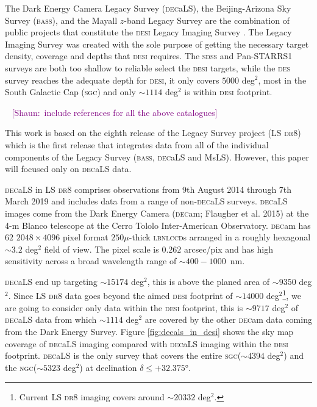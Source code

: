 \documentclass[fleqn,usenatbib]{mnras}
\newcommand{\shaun}[1]{~\newline\noindent \textcolor{Purple}{{ [Shaun:~{#1}]\\}}}
\newcommand{\BASS}{\textsc{bass}\xspace}
\newcommand{\CCDs}{\textsc{ccd}s\xspace}
\newcommand{\DECam}{\textsc{dec}am\xspace}
\newcommand{\DECaLS}{\textsc{dec}a\textsc{LS}\xspace}
\newcommand{\DESI}{\textsc{desi}\xspace}
\newcommand{\DES}{\textsc{des}\xspace}
\newcommand{\DReight}{\textsc{dr8}\xspace}
\newcommand{\LBNL}{\textsc{lbnl}\xspace}
\newcommand{\MzLS}{\textsc{M}s\textsc{LS}\xspace}
\newcommand{\NGC}{\textsc{ngc}\xspace}
\newcommand{\SDSS}{\textsc{sdss}\xspace}
\newcommand{\SGC}{\textsc{sgc}\xspace}
\newcommand{\PS}{\textsc{ps}1\xspace}
\begin{document}
The Dark Energy Camera Legacy Survey (\DECaLS), the Beijing-Arizona Sky Survey (\BASS), and the Mayall $z$-band Legacy Survey are the combination of public projects that constitute the \DESI Legacy Imaging Survey  \citep[hereafter the Legacy Survey][]{2019AJ....157..168D}. The Legacy Imaging Survey was created with the sole purpose of getting the necessary target density, coverage and depths that \DESI requires. The \SDSS \citep{Wang:2013noa} and Pan-STARRS1 \citep[\PS][]{2016arXiv161205560C} surveys are both too shallow to reliable select the \DESI targets, while the \DES survey\citep{Abbott:2005bi} reaches the adequate depth for \DESI, it only covers $5000$ deg$^2$, most in the South Galactic Cap (\SGC) and only $\sim 1114$ deg$^2$ is within \DESI footprint.

\shaun{include references for all the above catalogues} 

This work is based on the eighth release of the Legacy Survey project (LS \DReight) which is the first release that integrates data from all of the individual components of the Legacy Survey (\BASS, \DECaLS and \MzLS). However, this paper will focused only on \DECaLS data.

\DECaLS in LS \DReight comprises observations from 9th August 2014 through 7th March 2019 and includes data from a range of non-\DECaLS surveys. \DECaLS images come from the Dark Energy Camera (\DECam; Flaugher et al. 2015) at the 4-m Blanco telescope at the Cerro Tololo Inter-American Observatory. \DECam has $62$ $2048\times 4096$ pixel format $250 \mu$-thick \LBNL \CCDs arranged in a roughly hexagonal $\sim 3.2$ deg$^2$ field of view. The pixel scale is $0.262$ arcsec/pix and has high sensitivity across a broad wavelength range of $\sim 400-1000$~nm. 

\DECaLS end up targeting $\sim 15174$ deg$^2$, this is above the planed area of $\sim 9350$ deg$^2$\citep{2019AJ....157..168D}. Since LS \DReight data goes beyond the aimed \DESI footprint of $\sim 14000$ deg$^2$\footnote{Current LS \DReight imaging covers around $\sim 20332$ deg$^2$.}, we are going to consider only data within the \DESI footprint, this is $\sim 9717$ deg$^2$ of \DECaLS data from which $\sim 1114$ deg$^2$ are covered by the other \DECam data coming from the Dark Energy Survey\citep[\DES,][]{Abbott:2005bi}. Figure \ref{fig:decals_in_desi} shows the sky map coverage of \DECaLS imaging compared with \DECaLS imaging within the \DESI footprint. \DECaLS is the only survey that covers the entire \SGC ($\sim 4394$ deg$^2$) and the \NGC ($\sim 5323$ deg$^2$) at declination $\delta \leq +\ang{32.375}$. 
\end{document}
